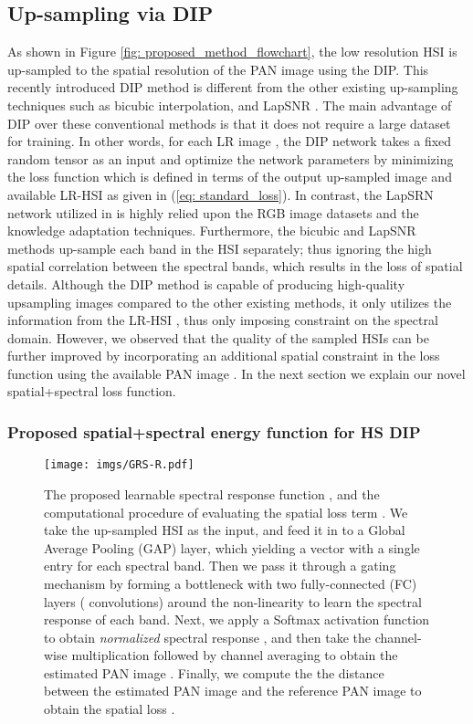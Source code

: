 \documentclass[journal]{IEEEtran}
\begin{document}
    
\subsection{Up-sampling via DIP}
    \label{DIP}
    \par As shown in Figure \ref{fig: proposed_method_flowchart}, the low resolution HSI  is up-sampled to the spatial resolution of the PAN image  using the DIP. This recently introduced DIP method is different from the other existing up-sampling techniques such as bicubic interpolation, and LapSNR \cite{lap_snr}. The main advantage of DIP over these conventional methods is that it does not require a large dataset for training. In other words, for each LR image , the DIP network takes a fixed random tensor  as an input and optimize the network parameters  by minimizing the loss function  which is defined in terms of the output up-sampled image  and available LR-HSI  as given in (\ref{eq: standard_loss}). In contrast, the LapSRN network utilized in \cite{DDLPS} is highly relied upon the RGB image datasets and the knowledge adaptation techniques. Furthermore, the bicubic and LapSNR methods up-sample each band in the HSI separately; thus ignoring the high spatial correlation between the spectral bands, which results in the loss of spatial details. Although the DIP method is capable of producing high-quality upsampling images compared to the other existing methods, it only utilizes the information from the LR-HSI , thus only imposing constraint on the spectral domain. However, we observed that the quality of the sampled HSIs can be further improved by incorporating an additional spatial constraint in the loss function using the available PAN image . In the next section we explain our novel spatial+spectral loss function. 
    
\subsubsection{Proposed spatial+spectral energy function for HS DIP}
    \label{proposed_dip}
    \begin{figure}[tb!]
        \centering
        \texttt{[image: imgs/GRS-R.pdf]}
        \caption{The proposed learnable spectral response function , and the computational procedure of evaluating the spatial loss term . We take the up-sampled HSI  as the input, and feed it in to a Global Average Pooling (GAP) layer, which yielding a vector with a single entry for each spectral band. Then we pass it through a gating mechanism  by  forming  a  bottleneck  with  two  fully-connected (FC) layers ( convolutions) around the non-linearity to learn the spectral response of each band. Next, we apply a Softmax activation function to obtain \textit{normalized} spectral response , and then take the channel-wise multiplication followed by channel averaging to obtain the estimated PAN image . Finally, we compute the the  distance between the estimated PAN image  and the reference PAN image  to obtain the spatial loss .}
        \label{fig:compute_spatial_loss}
    \end{figure}
    
\end{document}
